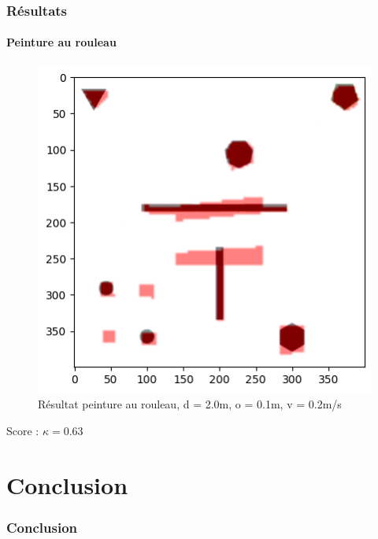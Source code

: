 \documentclass{beamer}
\begin{document}
		\begin{frame}
			\frametitle{Résultats}
			\framesubtitle{Peinture au rouleau}
			\begin{figure}
				\centering
				\includegraphics[scale=0.5]{graphics/output.png}
				\caption{Résultat peinture au rouleau, d = 2.0m, o = 0.1m, v = 0.2m/s}
			\end{figure}
			Score : $\kappa = 0.63$
		\end{frame}
	\section{Conclusion}
		\begin{frame}
			\frametitle{Conclusion}
		\end{frame}
\end{document}
